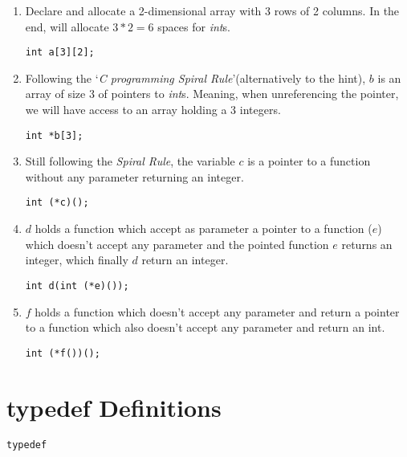 \begin{enumerate}
    \item Declare and allocate a 2-dimensional array with 3 rows of 2 columns. In the end, will allocate $3*2 = 6$ spaces for \emph{int}s.
    \begin{lstlisting}
int a[3][2];
    \end{lstlisting}

    \item Following the `\emph{C programming Spiral Rule}'(alternatively to the hint), $b$ is an array of size 3 of pointers to \emph{int}s. Meaning, when unreferencing the pointer, we will have access to an array holding a 3 integers.
    \begin{lstlisting}
int *b[3];
    \end{lstlisting}

    \item Still following the \emph{Spiral Rule}\footnotemark[1], the variable $c$ is a pointer to a function without any parameter returning an integer.
    \begin{lstlisting}
int (*c)();
    \end{lstlisting}

    \item $d$ holds a function which accept as parameter a pointer to a function ($e$) which doesn't accept any parameter and the pointed function $e$ returns an integer, which finally $d$ return an integer.
    \begin{lstlisting}
int d(int (*e)());
    \end{lstlisting}

    \item $f$ holds a function which doesn't accept any parameter and return a pointer to a function which also doesn't accept any parameter and return an int.
    \begin{lstlisting}
int (*f())();
    \end{lstlisting}
\end{enumerate}

%
%
\bigskip
\bigskip
\section{typedef Definitions}

\verb!typedef!

